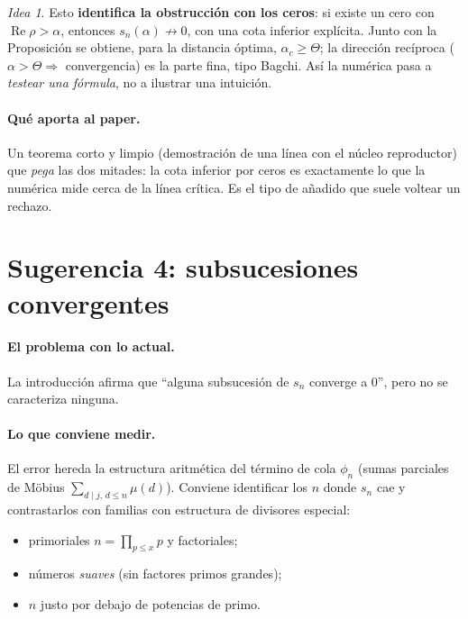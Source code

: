 \documentclass[11pt]{article}
\newcommand{\Reop}{\operatorname{Re}}
\theoremstyle{plain}
\theoremstyle{definition}
\theoremstyle{remark}
\newtheorem*{idea}{Idea}
\begin{document}
\begin{idea}
Esto \textbf{identifica la obstrucci\'on con los ceros}: si existe un cero con $\Reop\rho>\alpha$,
entonces $s_n(\alpha)\not\to0$, con una cota inferior expl\'icita. Junto con la Proposici\'on se
obtiene, para la distancia \'optima, $\alpha_c\ge\Theta$; la direcci\'on rec\'iproca
($\alpha>\Theta\Rightarrow$ convergencia) es la parte fina, tipo Bagchi. As\'i la num\'erica pasa a
\emph{testear una f\'ormula}, no a ilustrar una intuici\'on.
\end{idea}

\paragraph{Qu\'e aporta al paper.} Un teorema corto y limpio (demostraci\'on de una l\'inea con el
n\'ucleo reproductor) que \emph{pega} las dos mitades: la cota inferior por ceros es exactamente lo
que la numérica mide cerca de la l\'inea cr\'itica. Es el tipo de a\~nadido que suele voltear un
rechazo.

\bigskip

\section*{Sugerencia 4: subsucesiones convergentes}

\paragraph{El problema con lo actual.} La introducci\'on afirma que ``alguna subsucesi\'on de $s_n$
converge a $0$'', pero no se caracteriza ninguna.

\paragraph{Lo que conviene medir.} El error hereda la estructura aritm\'etica del t\'ermino de cola
$\phi_n$ (sumas parciales de M\"obius $\sum_{d\mid j,\,d\le n}\mu(d)$). Conviene identificar los
$n$ donde $s_n$ cae y contrastarlos con familias con estructura de divisores especial:
\begin{itemize}[leftmargin=*]
  \item primoriales $n=\prod_{p\le x}p$ y factoriales;
  \item n\'umeros \emph{suaves} (sin factores primos grandes);
  \item $n$ justo por debajo de potencias de primo.
\end{itemize}
\end{document}
